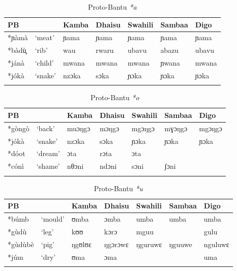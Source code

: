\documentclass[output=paper,colorlinks,citecolor=brown]{langscibook}
\begin{document}
\begin{table}
    \caption{Proto-Bantu \textit{*a}}
    \label{tab:ngonyani:9}
    \begin{tabular}{l@{ }l *5{l}}
    \lsptoprule
        PB & & Kamba & Dhaisu & Swahili & Sambaa & Digo \\
        \midrule
        *ɲàmà & `meat' & ɲama & ɲama   &ɲama  & ɲama  & ɲama  \\
        *bàdù̧  & `rib' & wau & rwaru  & ubavu & abazu & ubavu\\
        *jánà & `child' & mwana & mwana & mwana & ɲwana &  mwana\\
        *jókà & `snake' & nzɔka & sɔka & ɲɔka & ɲɔka &  ɲɔka\\
    \lspbottomrule
    \end{tabular}
\end{table}

\begin{table}
    \caption{Proto-Bantu \textit{*o}}
    \label{tab:ngonyani:10}
    \begin{tabular}{l@{ }l *5{l}}
    \lsptoprule
        PB & & Kamba & Dhaisu & Swahili & Sambaa & Digo \\
        \midrule
        *gòngò & `back' & muɔŋgɔ & mɔŋgɔ  & mgɔŋgɔ & mɣɔŋgɔ  & mgɔŋgɔ\\
        *jókà & `snake' & nzɔka & sɔka & ɲɔka & ɲɔka & ɲɔka \\
        *dóot & `dream' & ɔta & rɔta & ɔta & & \\
        *cónì & `shame' & nθɔni & ndɔni & sɔni & ʃɔni &  \\
    \lspbottomrule
    \end{tabular}
\end{table}

\begin{table}
    \caption{Proto-Bantu \textit{*u}}
    \label{tab:ngonyani:11}
    \begin{tabular}{l@{ }l *5{l}}
    \lsptoprule
        PB & & Kamba & Dhaisu & Swahili & Sambaa & Digo \\
        \midrule
        *búmb & `mould' & ʊmba & ɔmba  & umba &  umba & umba\\
        *gùdù  & `leg' & kʊʊ & kɔrɔ & mguu & & gulu\\
        *gùdùbè & `pig' & ŋgʊlʊɛ & ŋgɔrɔwɛ & ŋguruwɛ & ŋguuwe & nguluwɛ\\
        *júm & `dry' & ʊma & ɔma &  &  & uma\\
    \lspbottomrule
    \end{tabular}
\end{table}
\end{document}
